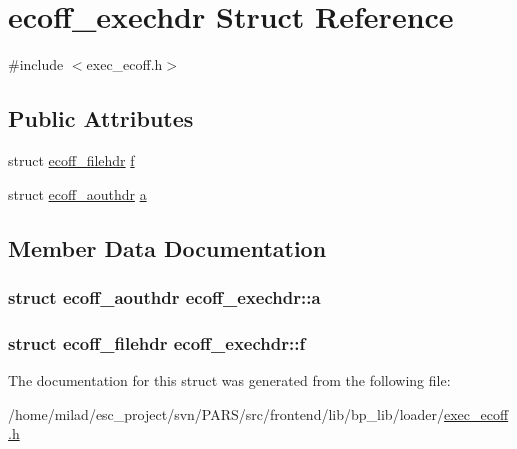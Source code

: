 \hypertarget{structecoff__exechdr}{
\section{ecoff\_\-exechdr Struct Reference}
\label{structecoff__exechdr}
}


{\ttfamily \#include $<$exec\_\-ecoff.h$>$}

\subsection*{Public Attributes}
\begin{DoxyCompactItemize}
\item 
struct \hyperlink{structecoff__filehdr}{ecoff\_\-filehdr} \hyperlink{structecoff__exechdr_aac8cdc399b8bab77efd14042f8308942}{f}
\item 
struct \hyperlink{structecoff__aouthdr}{ecoff\_\-aouthdr} \hyperlink{structecoff__exechdr_accf4b0339bf49c73a980523dcb42b2d7}{a}
\end{DoxyCompactItemize}


\subsection{Member Data Documentation}
\hypertarget{structecoff__exechdr_accf4b0339bf49c73a980523dcb42b2d7}{
\subsubsection[{a}]{\setlength{\rightskip}{0pt plus 5cm}struct {\bf ecoff\_\-aouthdr} {\bf ecoff\_\-exechdr::a}}}
\label{structecoff__exechdr_accf4b0339bf49c73a980523dcb42b2d7}
\hypertarget{structecoff__exechdr_aac8cdc399b8bab77efd14042f8308942}{
\subsubsection[{f}]{\setlength{\rightskip}{0pt plus 5cm}struct {\bf ecoff\_\-filehdr} {\bf ecoff\_\-exechdr::f}}}
\label{structecoff__exechdr_aac8cdc399b8bab77efd14042f8308942}


The documentation for this struct was generated from the following file:\begin{DoxyCompactItemize}
\item 
/home/milad/esc\_\-project/svn/PARS/src/frontend/lib/bp\_\-lib/loader/\hyperlink{exec__ecoff_8h}{exec\_\-ecoff.h}\end{DoxyCompactItemize}
